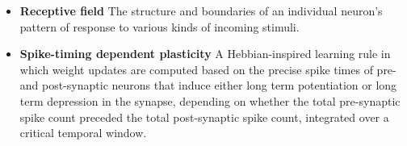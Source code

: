 \begin{itemize}


\item \textbf{Receptive field} The structure and boundaries of an individual neuron's pattern of response to various kinds of incoming stimuli.

\item \textbf{Spike-timing dependent plasticity} A Hebbian-inspired learning rule in which weight updates are computed based on the precise spike times of pre- and post-synaptic neurons that induce either long term potentiation or long term depression in the synapse, depending on whether the total pre-synaptic spike count preceded the total post-synaptic spike count, integrated over a critical temporal window.

\end{itemize}